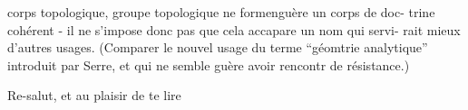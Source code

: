 
corps topologique, groupe topologique\deleted{,}  ne formen\hand{/}guère un corps de doc-%
trine cohérent - il ne s'impose donc pas que cela accapare un nom qui servi-%
rait mieux d'autres usages. (Comparer le nouvel usage du terme ``géomtrie
analytique'' introduit par Serre, et qui ne semble guère avoir rencontr de
résistance.)

Re-salut, et au plaisir de te lire



